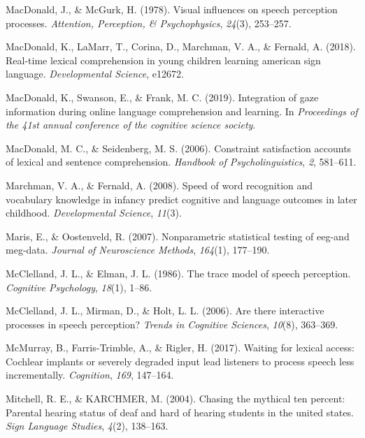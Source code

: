\documentclass[,man,floatsintext]{apa6}
\begin{document}
\leavevmode\hypertarget{ref-macdonald1978visual}{}%
MacDonald, J., \& McGurk, H. (1978). Visual influences on speech perception processes. \emph{Attention, Perception, \& Psychophysics}, \emph{24}(3), 253--257.

\leavevmode\hypertarget{ref-macdonald2018real}{}%
MacDonald, K., LaMarr, T., Corina, D., Marchman, V. A., \& Fernald, A. (2018). Real-time lexical comprehension in young children learning american sign language. \emph{Developmental Science}, e12672.

\leavevmode\hypertarget{ref-macdonald2019integration}{}%
MacDonald, K., Swanson, E., \& Frank, M. C. (2019). Integration of gaze information during online language comprehension and learning. In \emph{Proceedings of the 41st annual conference of the cognitive science society}.

\leavevmode\hypertarget{ref-macdonald2006constraint}{}%
MacDonald, M. C., \& Seidenberg, M. S. (2006). Constraint satisfaction accounts of lexical and sentence comprehension. \emph{Handbook of Psycholinguistics}, \emph{2}, 581--611.

\leavevmode\hypertarget{ref-marchman2008speed}{}%
Marchman, V. A., \& Fernald, A. (2008). Speed of word recognition and vocabulary knowledge in infancy predict cognitive and language outcomes in later childhood. \emph{Developmental Science}, \emph{11}(3).

\leavevmode\hypertarget{ref-maris2007nonparametric}{}%
Maris, E., \& Oostenveld, R. (2007). Nonparametric statistical testing of eeg-and meg-data. \emph{Journal of Neuroscience Methods}, \emph{164}(1), 177--190.

\leavevmode\hypertarget{ref-mcclelland1986trace}{}%
McClelland, J. L., \& Elman, J. L. (1986). The trace model of speech perception. \emph{Cognitive Psychology}, \emph{18}(1), 1--86.

\leavevmode\hypertarget{ref-mcclelland2006there}{}%
McClelland, J. L., Mirman, D., \& Holt, L. L. (2006). Are there interactive processes in speech perception? \emph{Trends in Cognitive Sciences}, \emph{10}(8), 363--369.

\leavevmode\hypertarget{ref-mcmurray2017waiting}{}%
McMurray, B., Farris-Trimble, A., \& Rigler, H. (2017). Waiting for lexical access: Cochlear implants or severely degraded input lead listeners to process speech less incrementally. \emph{Cognition}, \emph{169}, 147--164.

\leavevmode\hypertarget{ref-mitchell2004chasing}{}%
Mitchell, R. E., \& KARCHMER, M. (2004). Chasing the mythical ten percent: Parental hearing status of deaf and hard of hearing students in the united states. \emph{Sign Language Studies}, \emph{4}(2), 138--163.
\end{document}
